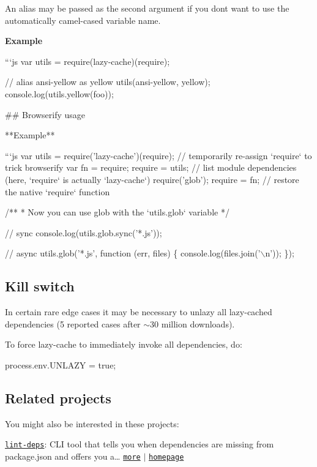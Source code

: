 An alias may be passed as the second argument if you don\textquotesingle{}t want to use the automatically camel-\/cased variable name.

{\bfseries Example}

```js var utils = require(\textquotesingle{}lazy-\/cache\textquotesingle{})(require);

// alias {\ttfamily ansi-\/yellow} as {\ttfamily yellow} utils(\textquotesingle{}ansi-\/yellow\textquotesingle{}, \textquotesingle{}yellow\textquotesingle{}); console.\+log(utils.\+yellow(\textquotesingle{}foo\textquotesingle{})); 
\begin{DoxyCode}
## Browserify usage

**Example**

```js
var utils = require('lazy-cache')(require);
// temporarily re-assign `require` to trick browserify
var fn = require;
require = utils;
// list module dependencies (here, `require` is actually `lazy-cache`)
require('glob');
require = fn; // restore the native `require` function

/**
 * Now you can use glob with the `utils.glob` variable
 */

// sync
console.log(utils.glob.sync('*.js'));

// async
utils.glob('*.js', function (err, files) \{
  console.log(files.join('\(\backslash\)n'));
\});
\end{DoxyCode}


\subsection*{Kill switch}

In certain rare edge cases it may be necessary to unlazy all lazy-\/cached dependencies (5 reported cases after $\sim$30 million downloads).

To force lazy-\/cache to immediately invoke all dependencies, do\+:


\begin{DoxyCode}
process.env.UNLAZY = true;
\end{DoxyCode}


\subsection*{Related projects}

You might also be interested in these projects\+:

\href{https://www.npmjs.com/package/lint-deps}{\tt lint-\/deps}\+: C\+LI tool that tells you when dependencies are missing from package.\+json and offers you a… \href{https://www.npmjs.com/package/lint-deps}{\tt more} $\vert$ \href{https://github.com/jonschlinkert/lint-deps}{\tt homepage}

